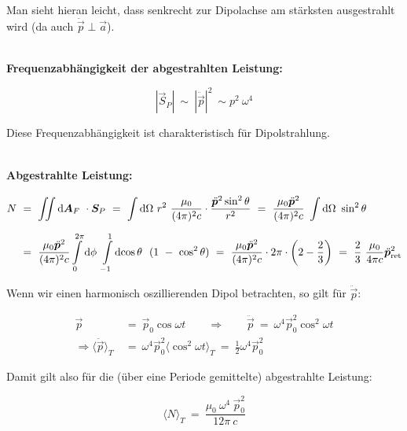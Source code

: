 Man sieht hieran leicht, dass senkrecht zur Dipolachse am stärksten ausgestrahlt wird (da auch $\ddot{\vec{p}}\perp \vec{a}$).

\ \\
\textbf{Frequenzabhängigkeit der abgestrahlten Leistung:}

\begin{equation*}
|\vec{S}_P|  \ \sim \ |\ddot{\vec{p}}|^2 \ \sim p^2 \ \omega^4
\end{equation*}

Diese Frequenzabhängigkeit ist charakteristisch für Dipolstrahlung.

\ \\
\textbf{Abgestrahlte Leistung:}

\begin{align*}
N  \ &= \ \Iint{}{}{\vec{A}_F} \cdot \vec{S}_P  \ = \ \Int{}{}{\Omega}r^2 \ \frac{\mu_0}{(4\pi)^2c}\cdot\frac{\ddot{\vec{p}}^2\sin^2\theta}{r^2}  \ = \ \frac{\mu_0\ddot{\vec{p}}^2}{(4\pi)^2c} \ \Int{}{}{\Omega}\sin^2\theta\\
&= \ \frac{\mu_0\ddot{\vec{p}}^2}{(4\pi)^2c} \Int{0}{2\pi}{\phi}\Int{-1}{1}{\cos\theta} \ (1 \ - \ \cos^2\theta) \ = \ \frac{\mu_0\ddot{\vec{p}}^2}{(4\pi)^2c} \cdot 2\pi \cdot \left(2-\frac{2}{3}\right) \ = \ \frac{2}{3} \ \frac{\mu_0}{4\pi c} \ddot{\vec{p}}^2_{\text{ret}}
\end{align*}

Wenn wir einen harmonisch oszillierenden Dipol betrachten, so gilt für $\ddot{\vec{p}}$:

\begin{align*}
\vec{p}  \ &= \ \vec{p}_0 \cos\omega t \qquad \Rightarrow \qquad \ddot{\vec{p}}  \ = \ \omega^4\vec{p}_0^2\cos^2\omega t\\
\Rightarrow \langle\ddot{\vec{p}}\rangle_T  \ &= \  \omega^4\vec{p}_0^2 \langle\cos^2\omega t\rangle_T  \ = \ \frac{1}{2} \omega^4 \vec{p}_0^2
\end{align*}

Damit gilt also für die (über eine Periode gemittelte) abgestrahlte Leistung:

\begin{equation*}
\langle N \rangle_T  \ = \  \frac{\mu_0 \ \omega^4\ \vec{p}_0^2}{12\pi \ c}
\end{equation*}